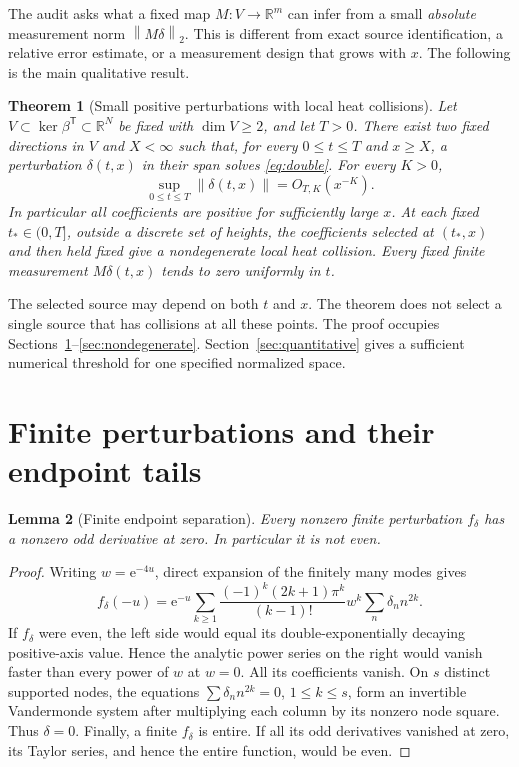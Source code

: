 \documentclass[11pt]{article}
\newtheorem{theorem}{Theorem}[section]
\newtheorem{lemma}[theorem]{Lemma}
\theoremstyle{remark}\newtheorem{remark}[theorem]{Remark}
\newcommand{\R}{\mathbb R}
\newcommand{\norm}[1]{\left\lVert #1\right\rVert}
\newcommand{\e}{\mathrm e}
\begin{document}
The audit asks what a fixed map $M:V\to\R^m$ can infer from a small \emph{absolute} measurement norm $\norm{M\delta}_2$. This is different from exact source identification, a relative error estimate, or a measurement design that grows with $x$. The following is the main qualitative result.

\begin{theorem}[Small positive perturbations with local heat collisions]\label{thm:main}
Let $V\subset\ker\beta^{\mathsf T}\subset\R^N$ be fixed with $\dim V\ge2$, and let $T>0$. There exist two fixed directions in $V$ and $X<\infty$ such that, for every $0\le t\le T$ and $x\ge X$, a perturbation $\delta(t,x)$ in their span solves \eqref{eq:double}. For every $K>0$,
\[
 \sup_{0\le t\le T}\norm{\delta(t,x)}=O_{T,K}(x^{-K}).
\]
In particular all coefficients are positive for sufficiently large $x$. At each fixed $t_*\in(0,T]$, outside a discrete set of heights, the coefficients selected at $(t_*,x)$ and then held fixed give a nondegenerate local heat collision. Every fixed finite measurement $M\delta(t,x)$ tends to zero uniformly in $t$.
\end{theorem}

The selected source may depend on both $t$ and $x$. The theorem does not select a single source that has collisions at all these points. The proof occupies Sections~\ref{sec:endpoints}--\ref{sec:nondegenerate}. Section~\ref{sec:quantitative} gives a sufficient numerical threshold for one specified normalized space.

\section{Finite perturbations and their endpoint tails}\label{sec:endpoints}
\begin{lemma}[Finite endpoint separation]\label{lem:finite}
Every nonzero finite perturbation $f_\delta$ has a nonzero odd derivative at zero. In particular it is not even.
\end{lemma}
\begin{proof}
Writing $w=\e^{-4u}$, direct expansion of the finitely many modes gives
\begin{equation}\label{eq:reflectionseries}
 f_\delta(-u)=\e^{-u}\sum_{k\ge1}
 \frac{(-1)^k(2k+1)\pi^k}{(k-1)!}w^k
 \sum_n\delta_n n^{2k}.
\end{equation}
If $f_\delta$ were even, the left side would equal its double-exponentially decaying positive-axis value. Hence the analytic power series on the right would vanish faster than every power of $w$ at $w=0$. All its coefficients vanish. On $s$ distinct supported nodes, the equations $\sum\delta_n n^{2k}=0$, $1\le k\le s$, form an invertible Vandermonde system after multiplying each column by its nonzero node square. Thus $\delta=0$. Finally, a finite $f_\delta$ is entire. If all its odd derivatives vanished at zero, its Taylor series, and hence the entire function, would be even.
\end{proof}
\end{document}
